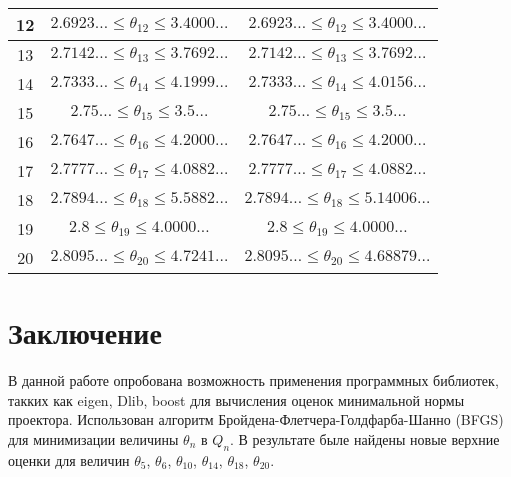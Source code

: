\documentclass[12pt, a4paper]{extarticle}
\begin{document}
\begin{center}
\begin{tabular}{|c|c|c|}
		12 & $2.6923\ldots\leqslant\theta_{12}\leqslant3.4000\dots$& $2.6923\ldots\leqslant\theta_{12}\leqslant3.4000\dots$ \\ \hline
		13 & $2.7142\ldots\leqslant\theta_{13}\leqslant3.7692\dots$ &$2.7142\ldots\leqslant\theta_{13}\leqslant3.7692\dots$ \\ \hline
		14 &$2.7333\ldots\leqslant\theta_{14}\leqslant4.1999\dots$ & $2.7333\ldots\leqslant\theta_{14}\leqslant4.0156\dots$\\ \hline
		15 & $2.75\ldots\leqslant\theta_{15}\leqslant3.5\dots$&  $2.75\ldots\leqslant\theta_{15}\leqslant3.5\dots$\\ \hline
		16 & $2.7647\ldots\leqslant\theta_{16}\leqslant4.2000\dots$ & $2.7647\ldots\leqslant\theta_{16}\leqslant4.2000\dots$\\ \hline
		17 &$2.7777\ldots\leqslant\theta_{17}\leqslant4.0882\dots$ &$2.7777\ldots\leqslant\theta_{17}\leqslant4.0882\dots$ \\ \hline
		18 & $2.7894\ldots\leqslant\theta_{18}\leqslant5.5882\dots$& $2.7894\ldots\leqslant\theta_{18}\leqslant5.14006\dots$\\ \hline
		19 &$2.8\leqslant\theta_{19}\leqslant4.0000\dots$ & $2.8\leqslant\theta_{19}\leqslant4.0000\dots$\\ \hline
		20 &$2.8095\ldots\leqslant\theta_{20}\leqslant4.7241\dots$ &$2.8095\ldots\leqslant\theta_{20}\leqslant4.68879\dots$ \\ \hline
	\end{tabular}
\end{center}

\newpage
\section{Заключение} 
В данной работе опробована возможность применения программных библиотек, такких как eigen, Dlib, boost для вычисления оценок минимальной нормы проектора. Использован алгоритм Бройдена-Флетчера-Голдфарба-Шанно (BFGS) для минимизации величины $\theta_n$ в $Q_n$. В результате быле найдены новые верхние оценки для величин  $\theta_5$, $\theta_6$,  $\theta_{10}$, $\theta_{14}$, $\theta_{18}$, $\theta_{20}$.  
\end{document}
